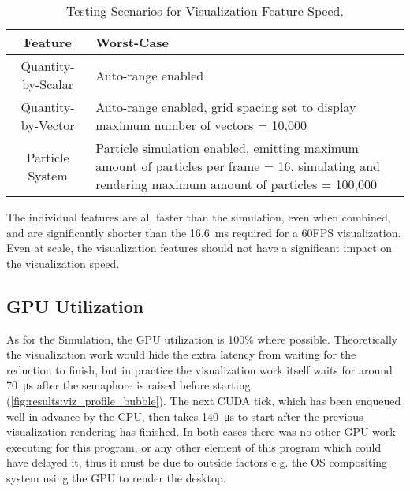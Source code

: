 \begin{table}[]
    \centering
    \begin{tabular}{c|p{}}
        Feature & Worst-Case \\
        \hline
        Quantity-by-Scalar & Auto-range enabled \\
        Quantity-by-Vector & Auto-range enabled, grid spacing set to display maximum number of vectors = 10,000 \\
        Particle System & Particle simulation enabled, emitting maximum amount of particles per frame = 16, simulating and rendering maximum amount of particles = 100,000 \\
    \end{tabular}
    \caption{Testing Scenarios for Visualization Feature Speed.}
    \label{tab:results:vizworstcases}
\end{table}



The individual features are all faster than the simulation, even when combined, and are significantly shorter than the \SI{16.6}{\milli\second} required for a 60FPS visualization.
Even at scale, the visualization features should not have a significant impact on the visualization speed.

\subsection{GPU Utilization}\label{sec:Results:Viz:Efficiency}

As for the Simulation, the GPU utilization is 100\% where possible.
Theoretically the visualization work would hide the extra latency from waiting for the reduction to finish, but in practice the visualization work itself waits for around \SI{70}{\micro\second} after the semaphore is raised before starting (\cref{fig:results:viz_profile_bubble}).
The next CUDA tick, which has been enqueued well in advance by the CPU, then takes \SI{140}{\micro\second} to start after the previous visualization rendering has finished.
In both cases there was no other GPU work executing for this program, or any other element of this program which could have delayed it, thus it must be due to outside factors e.g. the OS compositing system using the GPU to render the desktop.



